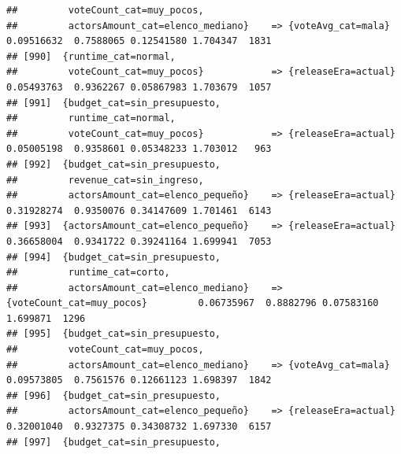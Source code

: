 \documentclass[
]{article}
\begin{document}
\begin{verbatim}
##         voteCount_cat=muy_pocos,                                                                                                
##         actorsAmount_cat=elenco_mediano}    => {voteAvg_cat=mala}                0.09516632  0.7588065 0.12541580 1.704347  1831
## [990]  {runtime_cat=normal,                                                                                                     
##         voteCount_cat=muy_pocos}            => {releaseEra=actual}               0.05493763  0.9362267 0.05867983 1.703679  1057
## [991]  {budget_cat=sin_presupuesto,                                                                                             
##         runtime_cat=normal,                                                                                                     
##         voteCount_cat=muy_pocos}            => {releaseEra=actual}               0.05005198  0.9358601 0.05348233 1.703012   963
## [992]  {budget_cat=sin_presupuesto,                                                                                             
##         revenue_cat=sin_ingreso,                                                                                                
##         actorsAmount_cat=elenco_pequeño}    => {releaseEra=actual}               0.31928274  0.9350076 0.34147609 1.701461  6143
## [993]  {actorsAmount_cat=elenco_pequeño}    => {releaseEra=actual}               0.36658004  0.9341722 0.39241164 1.699941  7053
## [994]  {budget_cat=sin_presupuesto,                                                                                             
##         runtime_cat=corto,                                                                                                      
##         actorsAmount_cat=elenco_mediano}    => {voteCount_cat=muy_pocos}         0.06735967  0.8882796 0.07583160 1.699871  1296
## [995]  {budget_cat=sin_presupuesto,                                                                                             
##         voteCount_cat=muy_pocos,                                                                                                
##         actorsAmount_cat=elenco_mediano}    => {voteAvg_cat=mala}                0.09573805  0.7561576 0.12661123 1.698397  1842
## [996]  {budget_cat=sin_presupuesto,                                                                                             
##         actorsAmount_cat=elenco_pequeño}    => {releaseEra=actual}               0.32001040  0.9327375 0.34308732 1.697330  6157
## [997]  {budget_cat=sin_presupuesto,                                                                                             

\end{verbatim}
\end{document}
